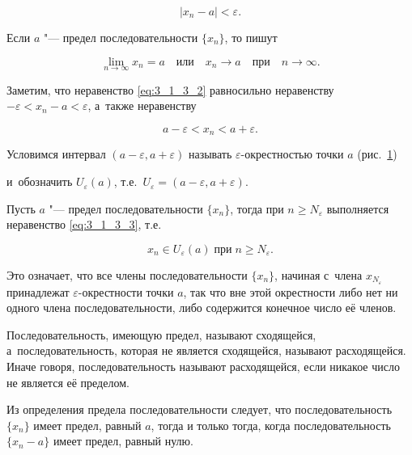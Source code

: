 \begin{equation}\label{eq:3_1_3_2}
|x_{n} - a| < \varepsilon.
\end{equation}

\noindent
Если $a$ "--- предел последовательности $\{ x_{n} \}$, то пишут

\begin{equation*}
\lim_{n \to \infty} x_{n} = a \quad \text{или} \quad x_{n} \to a \quad \text{при} \quad n \to \infty.
\end{equation*}

\noindent
Заметим, что неравенство \eqref{eq:3_1_3_2} равносильно неравенству
$-\varepsilon < x_{n} - a < \varepsilon$, а~также неравенству

\begin{equation}\label{eq:3_1_3_3}
a - \varepsilon < x_{n} < a + \varepsilon.
\end{equation}

Условимся интервал $(a - \varepsilon, a + \varepsilon)$ называть $\varepsilon$-окрестностью
точки $a$ (рис.\ \ref{fig:3_1_3_2})

\begin{figure}\label{fig:3_1_3_2}
\end{figure}

\noindent
и~обозначить $U_{\varepsilon}(a)$, т.е.\ $U_{\varepsilon} = (a - \varepsilon, a + \varepsilon)$.

Пусть $a$ "--- предел последовательности $\{ x_{n} \}$, тогда при
$n \geqslant N_{\varepsilon}$ выполняется неравенство \eqref{eq:3_1_3_3}, т.е.\

\begin{equation*}
x_{n} \in U_{\varepsilon}(a) \; \text{при} \; n \geqslant N_{\varepsilon}.
\end{equation*}

Это означает, что все члены последовательности $\{x_{n}\}$, начиная с~члена
$x_{N_{\varepsilon}}$ принадлежат $\varepsilon$-окрестности точки $a$,
так что вне этой окрестности либо нет ни одного члена последовательности,
либо содержится конечное число её членов.

Последовательность, имеющую предел, называют сходящейся, а~последовательность,
которая не является сходящейся, называют расходящейся. Иначе говоря,
последовательность называют расходящейся, если никакое число не является её пределом.

Из определения предела последовательности следует, что последовательность $\{x_{n}\}$
имеет предел, равный $a$, тогда и только тогда, когда последовательность $\{x_{n}-a\}$
имеет предел, равный нулю.


